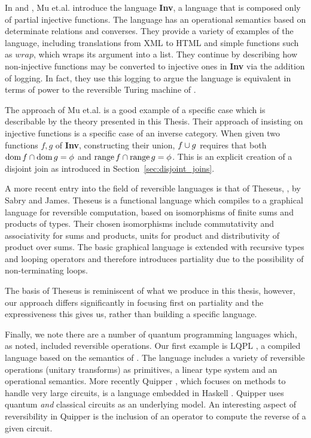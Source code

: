 In \cite{mu06bidirectional} and \cite{muetal04:injreversible}, Mu et.al. introduce the language
\textbf{Inv}, a language that is composed only of partial injective functions. The language has an
operational semantics based on determinate relations and converses. They provide a variety of examples of the
language, including translations from XML to HTML and simple functions such as $wrap$, which wraps
its argument into a list. They continue by describing how non-injective functions may be converted to
injective ones in \textbf{Inv} via the addition of logging. In fact, they use this logging to argue
the language is equivalent in terms of power to the reversible Turing machine of
\cite{bennett:1973reverse}.

The approach of Mu et.al. is a good example of a specific case which is describable by the theory
presented in this Thesis. Their approach of insisting on injective functions is a specific case of
an inverse category. When given two functions $f,g$ of \textbf{Inv}, constructing their union,
$f\cup g$ requires that both $\operatorname*{dom} f \cap \operatorname*{dom} g = \phi$ and $\operatorname*{range} f \cap \operatorname*{range} g =
\phi$. This is an explicit creation of a disjoint join as introduced in
Section~\ref{sec:disjoint_joins}.

A more recent entry into the field of reversible languages is that of Theseus,
\cite{james2014theseus}, by Sabry and James. Theseus is a functional language which compiles to
a graphical language \cite{james2013isomorphic,james2012information} for reversible computation, based on
isomorphisms of finite sums and products of types. Their chosen isomorphisms include commutativity
and associativity for sums and products, units for product and distributivity of product over
sums. The basic graphical language is extended with recursive types and looping operators and
therefore introduces partiality due to the possibility of non-terminating loops.

The basis of Theseus is reminiscent of what we produce in this thesis, however, our approach differs
significantly in focusing first on partiality and the expressiveness this gives us, rather than
building a specific language.


Finally, we note there are a number of quantum programming languages which, as noted, included
reversible operations. Our first example is LQPL \cite{giles2007}, a compiled language based on the
semantics of \cite{selinger04:qpl}. The language includes a variety of reversible operations
(unitary transforms) as primitives, a linear type system and an operational semantics. More recently
Quipper \cite{green2013introduction,green2013quipper}, which focuses on methods to handle very large
circuits, is a language embedded in Haskell \cite{peyton2003:haskell98}. Quipper uses quantum
\emph{and} classical circuits as an underlying model. An interesting aspect of reversibility in
Quipper is the inclusion of an operator to compute the reverse of a given circuit.

